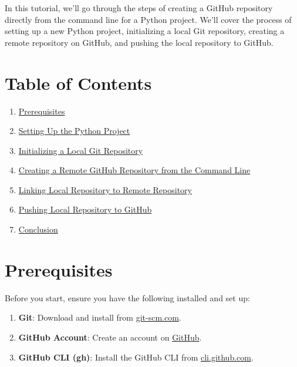 \documentclass[
  letterpaper,
  DIV=11,
  numbers=noendperiod]{scrreprt}
\providecommand{\tightlist}{%
  \setlength{\itemsep}{0pt}\setlength{\parskip}{0pt}}\usepackage{longtable,booktabs,array}
\begin{document}
In this tutorial, we'll go through the steps of creating a GitHub
repository directly from the command line for a Python project. We'll
cover the process of setting up a new Python project, initializing a
local Git repository, creating a remote repository on GitHub, and
pushing the local repository to GitHub.

\section{Table of Contents}\label{table-of-contents-27}

\begin{enumerate}
\def\labelenumi{\arabic{enumi}.}
\tightlist
\item
  \hyperref[prerequisites]{Prerequisites}
\item
  \hyperref[setting-up-the-python-project]{Setting Up the Python
  Project}
\item
  \hyperref[initializing-a-local-git-repository]{Initializing a Local
  Git Repository}
\item
  \hyperref[creating-a-remote-github-repository-from-the-command-line]{Creating
  a Remote GitHub Repository from the Command Line}
\item
  \hyperref[linking-local-repository-to-remote-repository]{Linking Local
  Repository to Remote Repository}
\item
  \hyperref[pushing-local-repository-to-github]{Pushing Local Repository
  to GitHub}
\item
  \hyperref[conclusion]{Conclusion}
\end{enumerate}

\section{Prerequisites}\label{prerequisites-2}

Before you start, ensure you have the following installed and set up:

\begin{enumerate}
\def\labelenumi{\arabic{enumi}.}
\tightlist
\item
  \textbf{Git}: Download and install from
  \href{https://git-scm.com/}{git-scm.com}.
\item
  \textbf{GitHub Account}: Create an account on
  \href{https://github.com/}{GitHub}.
\item
  \textbf{GitHub CLI (gh)}: Install the GitHub CLI from
  \href{https://cli.github.com/}{cli.github.com}.
\end{enumerate}
\end{document}

